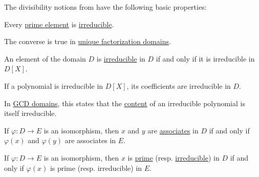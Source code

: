 \begin{proposition}\label{thm:def:domain_divisibility}
  The divisibility notions from  have the following basic properties:
  \begin{thmenum}
     Every \hyperref[def:domain_divisibility/prime]{prime element} is \hyperref[def:domain_divisibility/irreducible]{irreducible}.

    The converse is true in \hyperref[def:unique_factorization_domain]{unique factorization domains}.

     An element of the domain \( D \) is \hyperref[def:domain_divisibility/irreducible]{irreducible} in \( D \) if and only if it is irreducible in \( D[X] \).

     If a polynomial is irreducible in \( D[X] \), its coefficients are irreducible in \( D \).

    In \hyperref[def:gcd_domain]{GCD domains}, this states that the \hyperref[def:polynomial_content]{content} of an irreducible polynomial is itself irreducible.

     If \( \varphi: D \to E \) is an isomorphism, then \( x \) and \( y \) are \hyperref[def:domain_divisibility/associates]{associates} in \( D \) if and only if \( \varphi(x) \) and \( \varphi(y) \) are associates in \( E \).

     If \( \varphi: D \to E \) is an isomorphism, then \( x \) is \hyperref[def:domain_divisibility/prime]{prime} (resp. \hyperref[def:domain_divisibility/irreducible]{irreducible}) in \( D \) if and only if \( \varphi(x) \) is prime (resp. irreducible) in \( E \).
  \end{thmenum}
\end{proposition}
